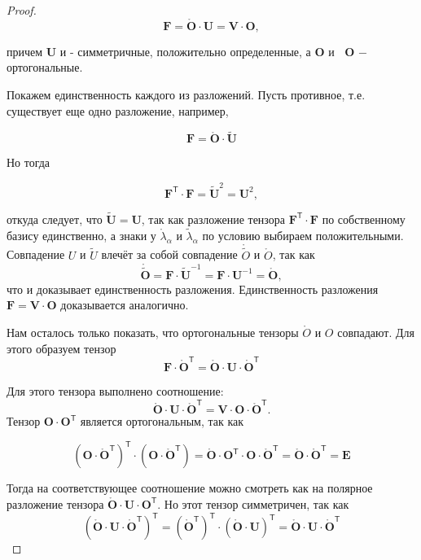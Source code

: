 \begin{proof}
\[
\mathbf{F}=\mathring{\mathbf{O}} \cdot \mathbf{U}=\mathbf{V} \cdot \mathbf{O},
\]

причем $\mathbf{U}$ и  - симметричные, положительно определенные, а $\mathbf{O}$ и $\mathbf{\text { O }}-$ ортогональные.

Покажем единственность каждого из разложений. Пусть противное, т.е. существует еще одно разложение, например,

\[
\mathbf{F}=\mathring{\mathbf{O}} \cdot \widetilde{\mathbf{U}}
\]

Но тогда

\[
\mathbf{F}^{\mathsf{T}} \cdot \mathbf{F}=\widetilde{\mathbf{U}}^{2}=\mathbf{U}^{2},
\]

откуда следует, что $\widetilde{\mathbf{U}}=\mathbf{U}$, так как разложение
тензора $\mathbf{F}^{\mathsf{T}} \cdot \mathbf{F}$ по собственному базису
единственно, а знаки у $\mathring{\lambda}_{\alpha}$ и $\widetilde{\lambda}_{\alpha}$
по условию выбираем положительными. Совпадение $ U $ и $ \widetilde U $ влечёт
за собой совпадение $ \mathring{\widetilde{O}} $ и $ \mathring{O} $, так как
\[
  \mathring{\widetilde{\mathbf{O}}}=\mathbf{F} \cdot
  \widetilde{\mathbf{U}}^{-1}=\mathbf{F}
\cdot \mathbf{U}^{-1}=\mathring{\mathbf{O}},
\]
что и доказывает единственность разложения. Единственность разложения $\mathbf{F}=\mathbf{V} \cdot \mathbf{O}$ доказывается аналогично.

Нам осталось только показать, что ортогональные тензоры $ \mathring{O} $ и $ O $
совпадают. Для этого образуем тензор
\[
\mathbf{F} \cdot \mathring{\mathbf{O}}^{\mathsf{T}}=\mathring{\mathbf{O}} \cdot \mathbf{U} \cdot \mathring{\mathbf{O}}^{\mathsf{T}}
\]

Для этого тензора выполнено соотношение:
\[
  \mathring{\mathbf{O}} \cdot \mathbf{U} \cdot \mathring{\mathbf{O}}^{\mathsf{T}}=\mathbf{V} \cdot \mathbf{O} \cdot \mathring{\mathbf{O}}^{\mathsf{T}} .
\]
Тензор $ \mathbf{O} \cdot \mathbf{O}^{\mathsf{T}}$ является ортогональным, так как

\[
\left(\mathbf{O} \cdot \mathring{\mathbf{O}}^{\mathsf{T}}\right)^{\mathsf{T}} \cdot\left(\mathbf{O} \cdot \mathring{\mathbf{O}}^{\mathsf{T}}\right)=\mathring{\mathbf{O}} \cdot \mathbf{O}^{\mathsf{T}} \cdot \mathbf{O} \cdot \mathring{\mathbf{O}}^{\mathsf{T}}=\mathring{\mathbf{O}} \cdot \mathring{\mathbf{O}}^{\mathsf{T}}=\mathbf{E}
\]

Тогда на соответствующее соотношение можно смотреть как на полярное разложение тензора $\mathring{\mathbf{O}} \cdot \mathbf{U} \cdot \mathbf{O}^{\mathsf{T}}$. Но этот тензор симметричен, так как
\[
\left(\mathring{\mathbf{O}} \cdot \mathbf{U} \cdot \mathring{\mathbf{O}}^{\mathsf{T}}\right)^{\mathsf{T}}=\left(\mathring{\mathbf{O}}^{\mathsf{T}}\right)^{\mathsf{T}} \cdot(\mathring{\mathbf{O}} \cdot \mathbf{U})^{\mathsf{T}}=\mathring{\mathbf{O}} \cdot \mathbf{U} \cdot \mathring{\mathbf{O}}^{\mathsf{T}}
\]


\end{proof}
